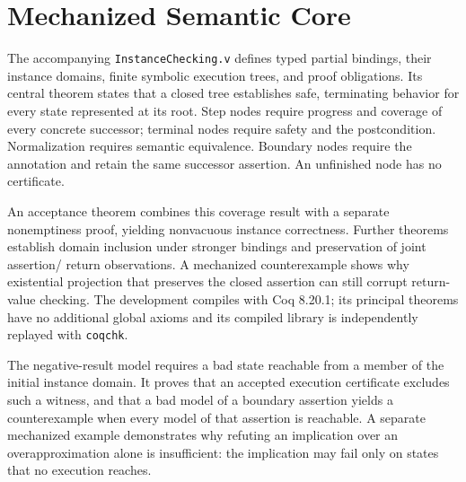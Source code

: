 \section{Mechanized Semantic Core}

The accompanying \texttt{InstanceChecking.v} defines typed partial bindings,
their instance domains, finite symbolic execution trees, and proof obligations.
Its central theorem states that a closed tree establishes safe, terminating
behavior for every state represented at its root. Step nodes require progress
and coverage of every concrete successor; terminal nodes require safety and
the postcondition. Normalization requires semantic equivalence. Boundary nodes
require the annotation and retain the same successor assertion. An unfinished
node has no certificate.

An acceptance theorem combines this coverage result with a separate nonemptiness
proof, yielding nonvacuous instance correctness. Further theorems establish
domain inclusion under stronger bindings and preservation of joint assertion/
return observations. A mechanized counterexample shows why existential
projection that preserves the closed assertion can still corrupt return-value
checking. The development compiles with Coq 8.20.1; its principal theorems have
no additional global axioms and its compiled library is independently replayed
with \texttt{coqchk}.

The negative-result model requires a bad state reachable from a member of the
initial instance domain. It proves that an accepted execution certificate
excludes such a witness, and that a bad model of a boundary assertion yields
a counterexample when every model of that assertion is reachable. A separate
mechanized example demonstrates why refuting an implication over an
overapproximation alone is insufficient: the implication may fail only on
states that no execution reaches.

